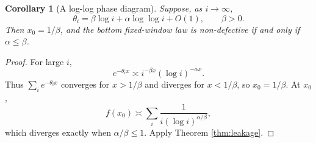 \documentclass[11pt]{article}
\newtheorem{corollary}[theorem]{Corollary}
\theoremstyle{remark}
\begin{document}
\begin{corollary}[A log-log phase diagram]\label{cor:loglog}
Suppose, as $i\to\infty$,
\[
        \theta_i=\beta\log i+\alpha\log\log i+O(1),
        \qquad \beta>0.
\]
Then \(x_0=1/\beta\), and the bottom fixed-window law is non-defective if and only if \(\alpha\le\beta\).
\end{corollary}

\begin{proof}
For large \(i\),
\[
        e^{-\theta_i x}\asymp i^{-\beta x}(\log i)^{-\alpha x}.
\]
Thus \(\sum_i e^{-\theta_i x}\) converges for \(x>1/\beta\) and diverges for \(x<1/\beta\), so \(x_0=1/\beta\).  At \(x_0\),
\[
        f(x_0)\asymp \sum_i\frac{1}{i(\log i)^{\alpha/\beta}},
\]
which diverges exactly when \(\alpha/\beta\le1\).  Apply Theorem \ref{thm:leakage}.
\end{proof}

\end{document}
